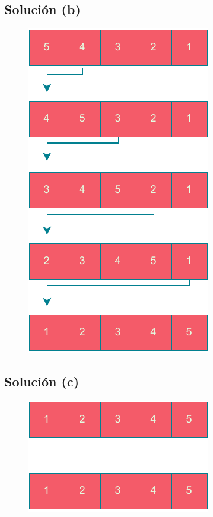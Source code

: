 \subsection{Solución (b)}
\begin{figure}[h]
    \centering
    \includegraphics[scale=0.6]{./estáticos/7b.pdf}
\end{figure}

\subsection{Solución (c)}
\begin{figure}[h]
    \centering
    \includegraphics[scale=0.6]{./estáticos/7c.pdf}
\end{figure}

